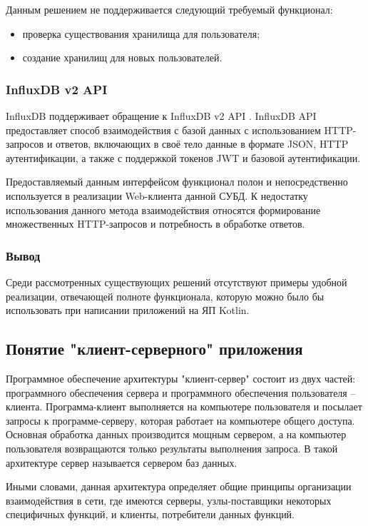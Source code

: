 Данным решением не поддерживается следующий требуемый функционал:
\begin{itemize}[leftmargin=1.6\parindent]
\item проверка существования хранилища для пользователя;
\item создание хранилищ для новых пользователей.
\end{itemize}

\subsubsection{InfluxDB v2 API}
InfluxDB поддерживает обращение к InfluxDB v2 API \cite{influxApi}. InfluxDB API предоставляет способ взаимодействия с базой данных с использованием HTTP-запросов и ответов, включающих в своё тело данные в формате JSON, HTTP аутентификации, а также с поддержкой токенов JWT и базовой аутентификации.

Предоставляемый данным интерфейсом функционал полон и непосредственно используется в реализации Web-клиента данной СУБД. К недостатку использования данного метода взаимодействия относятся формирование множественных HTTP-запросов и потребность в обработке ответов.

\subsubsection*{Вывод}
Среди рассмотренных существующих решений отсутствуют примеры удобной реализации, отвечающей полноте функционала, которую можно было бы использовать при написании приложений на ЯП Kotlin.

\subsection{Понятие "клиент-серверного" приложения}
Программное обеспечение архитектуры "клиент-сервер" состоит из двух частей: программного обеспечения сервера и программного обеспечения пользователя -- клиента. Программа-клиент выполняется на компьютере пользователя и посылает запросы к программе-серверу, которая работает на компьютере общего доступа. Основная обработка данных производится мощным сервером, а на компьютер пользователя возвращаются только результаты выполнения запроса. В такой архитектуре сервер называется сервером баз данных. \cite{clientServer}

Иными словами, данная архитектура определяет общие принципы организации взаимодействия в сети, где имеются серверы, узлы-поставщики некоторых специфичных функций, и клиенты, потребители данных функций.

